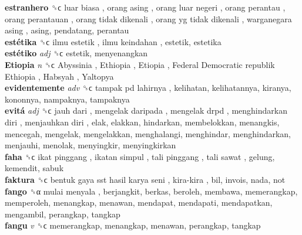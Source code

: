 \textbf{estranhero} ␝ϲ   luar biasa ,  orang asing ,  orang luar negeri ,  orang perantau ,  orang perantauan ,  orang tidak dikenali ,  orang yg tidak dikenali ,  warganegara asing , asing, pendatang, perantau  \\
\textbf{estétika} ␝ϲ   ilmu estetik ,  ilmu keindahan , estetik, estetika  \\
\textbf{estétiko} \emph{adj}  ␝ϲ  estetik, menyenangkan  \\
\textbf{Etiopia} \emph{n}  ␝ϲ   Abyssinia ,  Ethiopia ,  Etiopia ,  Federal Democratic republik Ethiopia ,  Habsyah ,  Yaltopya   \\
\textbf{evidentemente} \emph{adv}  ␝ϲ   tampak pd lahirnya , kelihatan, kelihatannya, kiranya, kononnya, nampaknya, tampaknya  \\
\textbf{evitá} \emph{adj}  ␝ϲ   jauh dari ,  mengelak daripada ,  mengelak drpd ,  menghindarkan diri ,  menjauhkan diri , elak, elakkan, hindarkan, membelokkan, menangkis, mencegah, mengelak, mengelakkan, menghalangi, menghindar, menghindarkan, menjauhi, menolak, menyingkir, menyingkirkan  \\
\textbf{faha} ␝ϲ   ikat pinggang ,  ikatan simpul ,  tali pinggang ,  tali sawat , gelung, kemendit, sabuk  \\
\textbf{faktura} ␝ϲ   bentuk gaya sst hasil karya seni ,  kira-kira , bil, invois, nada, not  \\
\textbf{fango} ␝α   mulai menyala , berjangkit, berkas, beroleh, membawa, memerangkap, memperoleh, menangkap, menawan, mendapat, mendapati, mendapatkan, mengambil, perangkap, tangkap  \\
\textbf{fangu} \emph{v}  ␝ϲ  memerangkap, menangkap, menawan, perangkap, tangkap  \\
